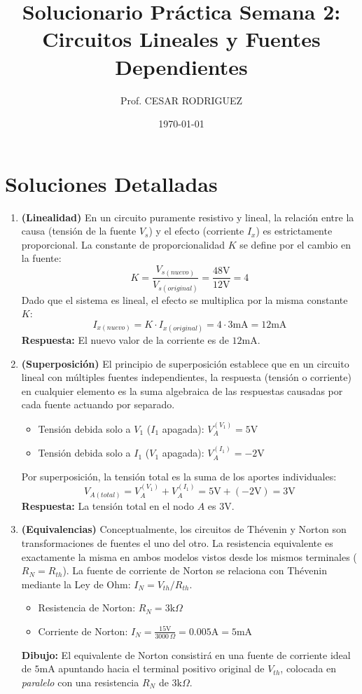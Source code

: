 \documentclass[12pt, a4paper]{article}
\title{\textbf{Solucionario Práctica Semana 2: \\ Circuitos Lineales y Fuentes Dependientes}}
\author{Prof. CESAR RODRIGUEZ}
\date{\today}
\begin{document}
\maketitle

\section*{Soluciones Detalladas}

\begin{enumerate}[leftmargin=*, itemsep=2em]

    \item \textbf{(Linealidad)} 
    En un circuito puramente resistivo y lineal, la relación entre la causa (tensión de la fuente $V_s$) y el efecto (corriente $I_x$) es estrictamente proporcional. La constante de proporcionalidad $K$ se define por el cambio en la fuente:
    $$K = \frac{V_{s(nuevo)}}{V_{s(original)}} = \frac{48\text{V}}{12\text{V}} = 4$$
    Dado que el sistema es lineal, el efecto se multiplica por la misma constante $K$:
    $$I_{x(nuevo)} = K \cdot I_{x(original)} = 4 \cdot 3\text{mA} = 12\text{mA}$$
    \textbf{Respuesta:} El nuevo valor de la corriente es de $12\text{mA}$.

    \item \textbf{(Superposición)}
    El principio de superposición establece que en un circuito lineal con múltiples fuentes independientes, la respuesta (tensión o corriente) en cualquier elemento es la suma algebraica de las respuestas causadas por cada fuente actuando por separado.
    \begin{itemize}
        \item Tensión debida solo a $V_1$ ($I_1$ apagada): $V_{A}^{(V_1)} = 5\text{V}$
        \item Tensión debida solo a $I_1$ ($V_1$ apagada): $V_{A}^{(I_1)} = -2\text{V}$
    \end{itemize}
    Por superposición, la tensión total es la suma de los aportes individuales:
    $$V_{A(total)} = V_{A}^{(V_1)} + V_{A}^{(I_1)} = 5\text{V} + (-2\text{V}) = 3\text{V}$$
    \textbf{Respuesta:} La tensión total en el nodo $A$ es $3\text{V}$.

    \item \textbf{(Equivalencias)}
    Conceptualmente, los circuitos de Thévenin y Norton son transformaciones de fuentes el uno del otro. La resistencia equivalente es exactamente la misma en ambos modelos vistos desde los mismos terminales ($R_N = R_{th}$). La fuente de corriente de Norton se relaciona con Thévenin mediante la Ley de Ohm: $I_N = V_{th} / R_{th}$.
    \begin{itemize}
        \item Resistencia de Norton: $R_N = 3\text{k}\Omega$
        \item Corriente de Norton: $I_N = \frac{15\text{V}}{3000\,\Omega} = 0.005\text{A} = 5\text{mA}$
    \end{itemize}
    \textbf{Dibujo:} El equivalente de Norton consistirá en una fuente de corriente ideal de $5\text{mA}$ apuntando hacia el terminal positivo original de $V_{th}$, colocada en \textit{paralelo} con una resistencia $R_N$ de $3\text{k}\Omega$.


\end{enumerate}
\end{document}
